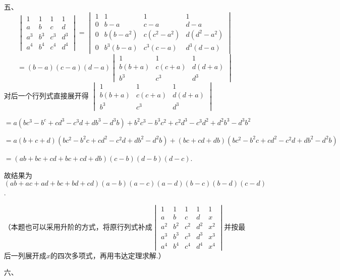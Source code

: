 \documentclass{ctexbook}
\begin{document}
\begin{enumerate}
\begin{enumerate}
    \end{enumerate}
    \item[五、]
    \[
    \begin{vmatrix}
    1 & 1 & 1 & 1 \\
    a & b & c & d \\
    a^3 & b^3 & c^3 & d^3 \\
    a^4 & b^4 & c^4 & d^4
    \end{vmatrix}
    =
    \begin{vmatrix}
    1 & 1 & 1 & 1 \\
    0 & b - a & c - a & d - a \\
    0 & b(b - a^2) & c(c^2 - a^2) & d(d^2 - a^2) \\
    0 & b^3(b - a) & c^3(c - a) & d^3(d - a)
    \end{vmatrix}\] 
    \[
    =(b - a)(c - a)(d - a)
    \begin{vmatrix}
    1 & 1 & 1 \\
    b(b + a) & c(c + a) & d(d + a) \\
    b^3 & c^3 & d^3
    \end{vmatrix}
    \]
    对后一个行列式直接展开得 \(
        \begin{vmatrix}
        1 & 1 & 1 \\
        b(b + a) & c(c + a) & d(d + a) \\
        b^3 & c^3 & d^3
        \end{vmatrix}\)\par
    \(=a(bc^3-b^c+cd^3-c^3d+db^3-d^3b)+b^2c^3-b^3c^2+c^2d^3-c^3d^2+d^2b^3-d^3b^2\)\par
    \(=a(b+c+d)(bc^2-b^2c+cd^2-c^2d+db^2-d^2b)+(bc+cd+db)(bc^2-b^2c+cd^2-c^2d+db^2-d^2b)\)\par
    \(=(ab+bc+cd+bc+cd+db)(c-b)(d-b)(d-c)\).\par
    故结果为 \((ab+ac+ad+bc+bd+cd)(a-b)(a-c)(a-d)(b-c)(b-d)(c-d)\).\par
    （本题也可以采用升阶的方式，将原行列式补成\(
        \begin{vmatrix}
            1 & 1 & 1 & 1 & 1 \\
            a & b & c & d & x \\
            a^2 & b^2 & c^2 & d^2 & x^2 \\
            a^3 & b^3 & c^3 & d^3 & x^3 \\
            a^4 & b^4 & c^4 & d^4 & x^4
            \end{vmatrix}
    \)并按最后一列展开成\(x\)的四次多项式，再用韦达定理求解.）
    \item[六、]

\end{enumerate}
\end{document}
